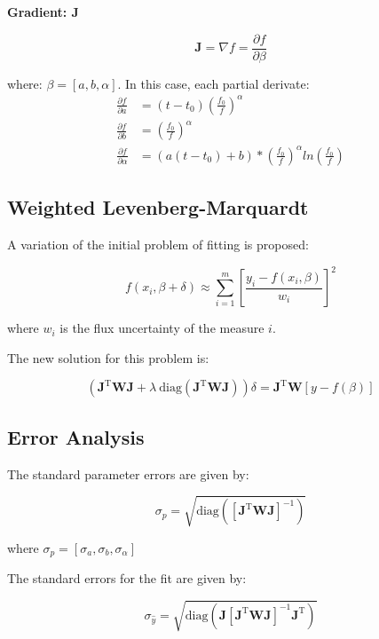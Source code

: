 \documentclass[10pt]{article}
\begin{document}
\noindent\textbf{Gradient: $\mathbf{J}$} 

$$ \mathbf{J} = \nabla f = \frac{\partial f}{\partial \beta} $$ 

where: $\beta = [a, b, \alpha]$. In this case, each partial derivate:
\begin{align*}
    \frac{\partial f}{\partial a}           &= (t - t_0)\left(\frac{f_0}{f}\right)^\alpha \\
    \frac{\partial f}{\partial b}           &= \left(\frac{f_0}{f}\right)^\alpha \\
    \frac{\partial f}{\partial \alpha}      &= (a(t-t_0)+b)*\left(\frac{f_0}{f}\right)^\alpha ln\left(\frac{f_0}{f}\right)
\end{align*}

\subsection{Weighted Levenberg-Marquardt}
A variation of the initial problem of fitting is proposed:

$$ f(x_i, \beta + \delta) \approx \sum\limits_{i=1}^m \left[\frac{y_i - f(x_i, \beta)}{w_i} \right]^2 $$

\noindent where $w_i$ is the flux uncertainty of the measure $i$.

\noindent The new solution for this problem is:

$$ (\mathbf{J}^{\text{T}}\mathbf{W}\mathbf{J} + \lambda~\text{diag}(\mathbf{J}^{\text{T}}\mathbf{W}\mathbf{J})) \delta = \mathbf{J}^{\text{T}}\mathbf{W}[y - f(\beta)] $$

\subsection{Error Analysis}

The standard parameter errors are given by:

$$ \sigma_p = \sqrt{\text{diag}([\mathbf{J}^{\text{T}}\mathbf{W}\mathbf{J}]^{-1})} $$

\noindent where $\sigma_p = [\sigma_a, \sigma_b, \sigma_{\alpha}] $


\noindent The standard errors for the fit are given by:

$$ \sigma_{\hat{y}} = \sqrt{\text{diag}(\mathbf{J}[\mathbf{J}^{\text{T}}\mathbf{W}\mathbf{J}]^{-1}\mathbf{J}^{\text{T}})} $$
\end{document}
